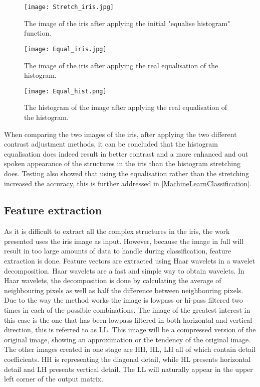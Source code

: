 \begin{figure}[H]
\centering
\texttt{[image: Stretch\_iris.jpg]}
\caption{The image of the iris after applying the initial "equalise histogram" function.}
\label{fig:irisST}
\end{figure}
\begin{figure}[H]
\centering
\texttt{[image: Equal\_iris.jpg]}
\caption{The image of the iris after applying the real equalisation of the histogram.}
\label{fig:irisEQ}
\end{figure}
\begin{figure}[h]
\centering
\texttt{[image: Equal\_hist.png]}
\caption{The histogram of the image after applying the real equalisation of the histogram.}
\label{fig:histEQ}
\end{figure}

When comparing the two images of the iris, after applying the two different contrast adjustment methods, it can be concluded that the histogram equalisation does indeed result in better contrast and a more enhanced and out spoken appearance of the structures in the iris than the histogram stretching does. Testing also showed that using the equalisation rather than the stretching increased the accuracy, this is further addressed in \autoref{MachineLearnClassification}. 

\subsection{Feature extraction}
As it is difficult to extract all the complex structures in the iris, the work presented uses the iris image as input. However, because the image in full will result in too large amounts of data to handle during classification, feature extraction is done. Feature vectors are extracted using Haar wavelets in a wavelet decomposition. 
Haar wavelets are a fast and simple way to obtain wavelets. In Haar wavelets, the decomposition is done by calculating the average of neighbouring pixels as well as half the difference between neighbouring pixels. Due to the way the method works the image is lowpass or hi-pass filtered two times in each of the possible combinations. The image of the greatest interest in this case is the one that has been lowpass filtered in both horizontal and vertical direction, this is referred to as LL. This image will be a compressed version of the original image, showing an approximation or the tendency of the original image. The other images created in one stage are HH, HL, LH all of which contain detail coefficients. HH is representing the diagonal detail, while HL presents horizontal detail and LH presents vertical detail. The LL will naturally appear in the upper left corner of the output matrix. 

